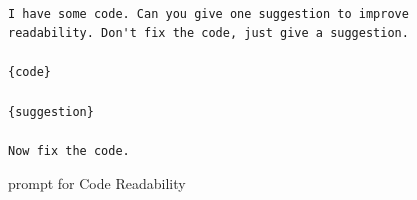 \begin{figure}[h!]
\tiny
    \captionsetup{justification=centering, labelfont=bf, font=small}
    \begin{verbatim}

I have some code. Can you give one suggestion to improve readability. Don't fix the code, just give a suggestion.

{code}

{suggestion}

Now fix the code.

\end{verbatim}

\caption{\itermod prompt for Code Readability}
\label{fig:prompt:readability:refine}
\end{figure}